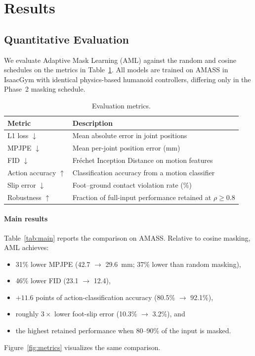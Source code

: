 \documentclass[10pt,letterpaper]{article}
\begin{document}
\section{Results}

\subsection{Quantitative Evaluation}

We evaluate Adaptive Mask Learning (AML) against the random and cosine schedules on the metrics in Table~\ref{tab:metrics}. All models are trained on AMASS in IsaacGym with identical physics-based humanoid controllers, differing only in the Phase~2 masking schedule.

\begin{table}[h]
  \centering
  \small
  \caption{Evaluation metrics.}
  \label{tab:metrics}
  \begin{tabular}{ll}
    \toprule
    Metric & Description \\
    \midrule
    L1 loss $\downarrow$ & Mean absolute error in joint positions \\
    MPJPE $\downarrow$ & Mean per-joint position error (mm) \\
    FID $\downarrow$ & Fr\'echet Inception Distance on motion features \\
    Action accuracy $\uparrow$ & Classification accuracy from a motion classifier \\
    Slip error $\downarrow$ & Foot--ground contact violation rate (\%) \\
    Robustness $\uparrow$ & Fraction of full-input performance retained at $\rho \ge 0.8$ \\
    \bottomrule
  \end{tabular}
\end{table}

\paragraph{Main results}
Table~\ref{tab:main} reports the comparison on AMASS. Relative to cosine masking, AML achieves:
\begin{itemize}
  \item 31\% lower MPJPE (42.7 $\rightarrow$ 29.6~mm; 37\% lower than random masking),
  \item 46\% lower FID (23.1 $\rightarrow$ 12.4),
  \item $+11.6$ points of action-classification accuracy (80.5\% $\rightarrow$ 92.1\%),
  \item roughly $3\times$ lower foot-slip error (10.3\% $\rightarrow$ 3.2\%), and
  \item the highest retained performance when 80--90\% of the input is masked.
\end{itemize}
Figure~\ref{fig:metrics} visualizes the same comparison.
\end{document}
